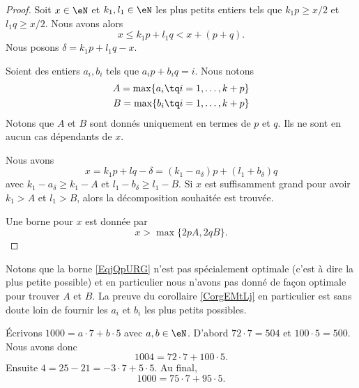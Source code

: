 \begin{proof}
    Soit \( x\in \eN\) et \( k_1,l_1\in \eN\) les plus petits entiers tels que \( k_1p\geq x/2\) et \( l_1q\geq x/2\). Nous avons alors
    \begin{equation}
        x\leq k_1p+l_1q<x+(p+q).
    \end{equation}
    Nous posons \( \delta=k_1p+l_1q-x\).
    
    Soient des entiers \( a_i,b_i\) tels que \( a_ip+b_iq=i\). Nous notons
    \begin{subequations}
        \begin{align}
            A=\max\{ a_i\tq i=1,\ldots, k+p \}\\
            B=\max\{ b_i\tq i=1,\ldots, k+p \}
        \end{align}
    \end{subequations}
    Notons que \( A\) et \( B\) sont donnés uniquement en termes de \( p\) et \( q\). Ils ne sont en aucun cas dépendants de \( x\).
    
    Nous avons
    \begin{equation}
        x=k_1p+lq-\delta=(k_1-a_{\delta})p+(l_1+b_{\delta})q
    \end{equation}
    avec \( k_1-a_{\delta}\geq k_1-A\) et \( l_1-b_{\delta}\geq l_1-B\). Si \( x\) est suffisamment grand pour avoir \( k_1>A\) et \( l_1>B\), alors la décomposition souhaitée est trouvée.  

    Une borne pour \( x\) est donnée par 
    \begin{equation}    \label{EqjQpURG}
        x>\max\{ 2pA,2qB \}.
    \end{equation}
\end{proof}
Notons que la borne \eqref{EqjQpURG} n'est pas spécialement optimale (c'est à dire la plus petite possible) et en particulier nous n'avons pas donné de façon optimale pour trouver \( A\) et \( B\). La preuve du corollaire \ref{CorgEMtLj} en particulier est sans doute loin de fournir les \( a_i\) et \( b_i\) les plus petits possibles.

\begin{example}
    Écrivons \( 1000=a\cdot 7+b\cdot 5\) avec \( a,b\in \eN\). D'abord \( 72\cdot 7=504\) et \( 100\cdot 5=500\). Nous avons donc 
    \begin{equation}
        1004=72\cdot 7+100\cdot 5.
    \end{equation}
    Ensuite \( 4=25-21=-3\cdot 7+5\cdot 5\). Au final,
    \begin{equation}
        1000=75\cdot 7+95\cdot 5.
    \end{equation}
\end{example}

